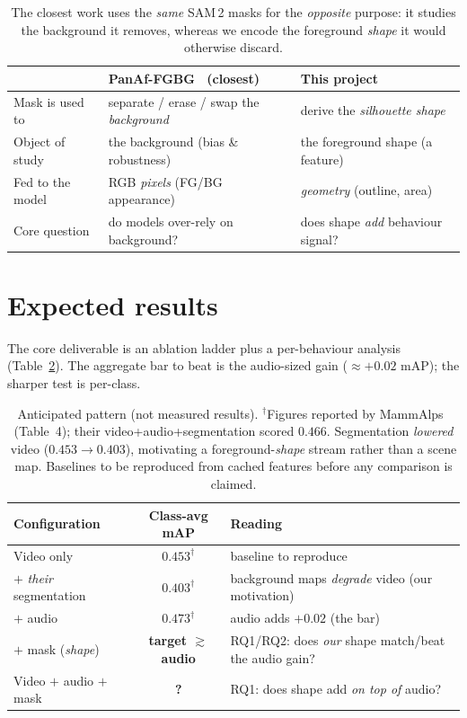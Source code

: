 \documentclass[11pt]{article}
\begin{document}
\begin{table}[h]
\centering\small
\begin{tabular}{@{}lll@{}}
\toprule
 & \textbf{PanAf-FGBG}~\cite{panaf} (closest) & \textbf{This project} \\
\midrule
Mask is used to  & separate / erase / swap the \emph{background} & derive the \emph{silhouette shape} \\
Object of study  & the background (bias \& robustness)           & the foreground shape (a feature) \\
Fed to the model & RGB \emph{pixels} (FG/BG appearance)          & \emph{geometry} (outline, area) \\
Core question    & do models over-rely on background?            & does shape \emph{add} behaviour signal? \\
\bottomrule
\end{tabular}
\caption{The closest work uses the \emph{same} SAM\,2 masks for the \emph{opposite} purpose: it studies the background it removes, whereas we encode the foreground \emph{shape} it would otherwise discard.}
\label{tab:vspanaf}
\end{table}

\section{Expected results}
The core deliverable is an ablation ladder plus a per-behaviour analysis (Table~\ref{tab:expected}). The aggregate bar to beat is the audio-sized gain ($\approx +0.02$ mAP); the sharper test is per-class.

\begin{table}[h]
\centering
\begin{tabular}{@{}lcl@{}}
\toprule
Configuration & Class-avg mAP & Reading \\
\midrule
Video only                          & $0.453^{\dagger}$ & baseline to reproduce \\
\quad $+$ \emph{their} segmentation  & $0.403^{\dagger}$ & background maps \emph{degrade} video (our motivation) \\
\quad $+$ audio                      & $0.473^{\dagger}$ & audio adds $+0.02$ (the bar) \\
\quad $+$ mask (\emph{shape})        & \textbf{target $\gtrsim$ audio} & RQ1/RQ2: does \emph{our} shape match/beat the audio gain? \\
Video $+$ audio $+$ mask             & \textbf{?} & RQ1: does shape add \emph{on top of} audio? \\
\bottomrule
\end{tabular}
\caption{Anticipated pattern (not measured results). $^{\dagger}$Figures reported by MammAlps~\cite{mammalps} (Table~4); their video+audio+segmentation scored $0.466$. Segmentation \emph{lowered} video ($0.453\to0.403$), motivating a foreground-\emph{shape} stream rather than a scene map. Baselines to be reproduced from cached features before any comparison is claimed.}
\label{tab:expected}
\end{table}
\end{document}
